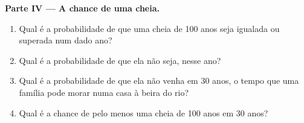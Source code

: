 \begin{problem}
\medskip
\noindent\textbf{Parte IV --- A chance de uma cheia.}
\begin{enumerate}[resume]
  \item Qual é a probabilidade de que uma cheia de \num{100} anos seja
        igualada ou superada num dado ano?
  \item Qual é a probabilidade de que ela não seja, nesse ano?
  \item Qual é a probabilidade de que ela não venha em \num{30} anos, o
        tempo que uma família pode morar numa casa à beira do rio?
  \item Qual é a chance de pelo menos uma cheia de \num{100} anos em
        \num{30} anos?
\end{enumerate}
\end{problem}
